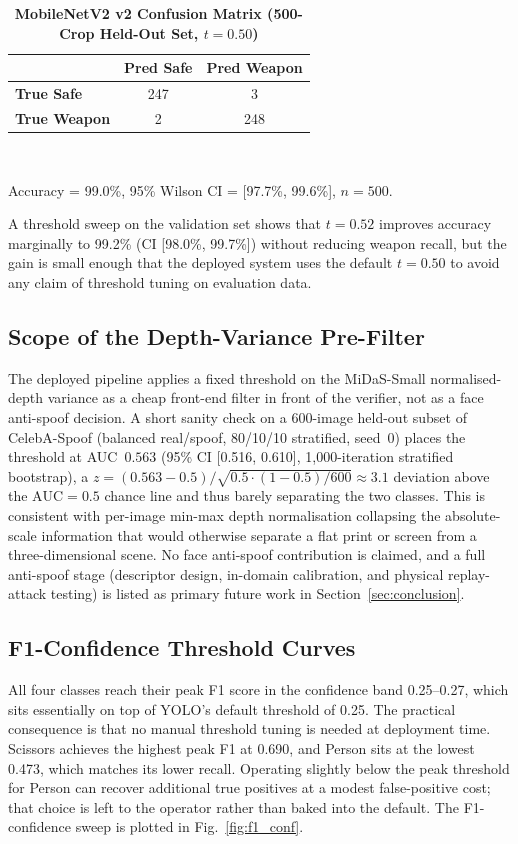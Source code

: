 \documentclass{ieeeaccess}
\begin{document}
\begin{table}[ht!]
\caption{\textbf{MobileNetV2 v2 Confusion Matrix (500-Crop Held-Out Set, $t{=}0.50$)}}
\label{tab:cls_confusion}
\setlength{\tabcolsep}{6pt}
\centering\small
\begin{tabular}{|l|c|c|}
\hline
 & \textbf{Pred Safe} & \textbf{Pred Weapon} \\
\hline
\textbf{True Safe}   & 247 & 3 \\
\textbf{True Weapon} & 2   & 248 \\
\hline
\end{tabular}\\[4pt]
\raggedright\scriptsize Accuracy = 99.0\%, 95\% Wilson CI = [97.7\%, 99.6\%], $n{=}500$.
\end{table}

A threshold sweep on the validation set shows that $t{=}0.52$ improves accuracy marginally to 99.2\% (CI [98.0\%, 99.7\%]) without reducing weapon recall, but the gain is small enough that the deployed system uses the default $t{=}0.50$ to avoid any claim of threshold tuning on evaluation data.


\subsection{Scope of the Depth-Variance Pre-Filter}
\label{sec:antispoof_eval}
The deployed pipeline applies a fixed threshold on the MiDaS-Small normalised-depth variance as a cheap front-end filter in front of the verifier, not as a face anti-spoof decision. A short sanity check on a 600-image held-out subset of CelebA-Spoof (balanced real/spoof, 80/10/10 stratified, seed~0) places the threshold at AUC~$0.563$ (95\% CI [0.516, 0.610], 1{,}000-iteration stratified bootstrap), a $z = (0.563 - 0.5)/\sqrt{0.5 \cdot (1-0.5) / 600} \approx 3.1$ deviation above the $\text{AUC} = 0.5$ chance line and thus barely separating the two classes. This is consistent with per-image min-max depth normalisation collapsing the absolute-scale information that would otherwise separate a flat print or screen from a three-dimensional scene. No face anti-spoof contribution is claimed, and a full anti-spoof stage (descriptor design, in-domain calibration, and physical replay-attack testing) is listed as primary future work in Section~\ref{sec:conclusion}.


\subsection{F1-Confidence Threshold Curves}
All four classes reach their peak F1 score in the confidence band 0.25--0.27, which sits essentially on top of YOLO's default threshold of 0.25. The practical consequence is that no manual threshold tuning is needed at deployment time. Scissors achieves the highest peak F1 at 0.690, and Person sits at the lowest 0.473, which matches its lower recall. Operating slightly below the peak threshold for Person can recover additional true positives at a modest false-positive cost; that choice is left to the operator rather than baked into the default. The F1-confidence sweep is plotted in Fig.~\ref{fig:f1_conf}.
\end{document}
